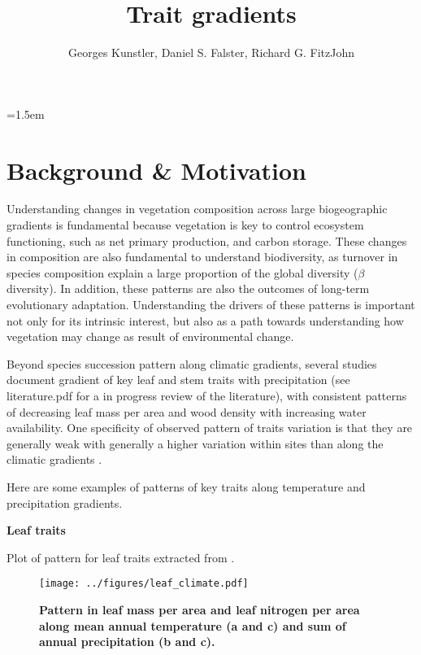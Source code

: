 \documentclass[a4paper,11pt]{article}
\title{Trait gradients}
\author{ Georges Kunstler, Daniel S. Falster, Richard G. FitzJohn}
\date{}
\affiliation{Department of Biological Sciences, Macquarie University,
  Sydney, Australia}
\begin{document}
\mstitleshort
\parindent=1.5em
\addtolength{\parskip}{.3em}


\section{Background \& Motivation}

Understanding changes in vegetation composition across large biogeographic gradients is fundamental because vegetation is key to control ecosystem functioning, such as net primary production, and carbon storage. These changes in composition are also fundamental to understand biodiversity, as turnover in species composition explain a large proportion of the global diversity ($\beta$ diversity). In addition, these patterns are also the outcomes of long-term evolutionary adaptation. Understanding the drivers of these patterns is important not only for its intrinsic interest, but also as a path towards understanding how vegetation may change as result of environmental change.

Beyond species succession pattern along climatic gradients, several studies document gradient of key leaf and stem traits with precipitation (see literature.pdf for a in progress review of the literature), with consistent patterns of decreasing leaf mass per area \citep{Wright-2004,Onoda-2011,Moles-2014} and wood density \citep{Chave-2006} with increasing water availability.  One specificity of observed pattern of traits variation is that they are generally weak with generally a higher variation within sites than along the climatic gradients \citep[see][]{Wright-2004}.

\clearpage

Here are some examples of patterns of key traits along temperature and precipitation gradients.

\textbf{Leaf traits}

Plot of pattern for leaf traits extracted from \citep{Wright-2004}.

\begin{figure}[ht]
\centering
\texttt{[image: ../figures/leaf\_climate.pdf]}
\caption{\textbf{Pattern in leaf mass per area and leaf nitrogen per area along mean annual temperature (a and c) and sum of annual precipitation (b and c).}%
\label{fig:leafpattern}}
\end{figure}
\end{document}
